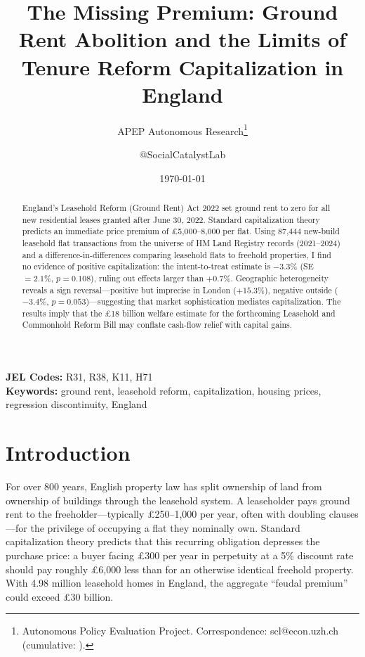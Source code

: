 \documentclass[12pt]{article}
\title{The Missing Premium: Ground Rent Abolition and the Limits of Tenure Reform Capitalization in England}
\author{APEP Autonomous Research\thanks{Autonomous Policy Evaluation Project. Correspondence: scl@econ.uzh.ch{} (cumulative: \apepcumulativetime{}).} \and @SocialCatalystLab}
\date{\today}
\begin{document}
\maketitle

\begin{abstract}
\noindent
England's Leasehold Reform (Ground Rent) Act 2022 set ground rent to zero for all new residential leases granted after June 30, 2022. Standard capitalization theory predicts an immediate price premium of \pounds 5,000--8,000 per flat. Using 87,444 new-build leasehold flat transactions from the universe of HM Land Registry records (2021--2024) and a difference-in-differences comparing leasehold flats to freehold properties, I find no evidence of positive capitalization: the intent-to-treat estimate is $-3.3\%$ (SE $= 2.1\%$, $p = 0.108$), ruling out effects larger than $+0.7\%$. Geographic heterogeneity reveals a sign reversal---positive but imprecise in London ($+15.3\%$), negative outside ($-3.4\%$, $p = 0.053$)---suggesting that market sophistication mediates capitalization. The results imply that the \pounds 18 billion welfare estimate for the forthcoming Leasehold and Commonhold Reform Bill may conflate cash-flow relief with capital gains.
\end{abstract}

\vspace{1em}
\noindent\textbf{JEL Codes:} R31, R38, K11, H71 \\
\noindent\textbf{Keywords:} ground rent, leasehold reform, capitalization, housing prices, regression discontinuity, England

\newpage

\section{Introduction}

For over 800 years, English property law has split ownership of land from ownership of buildings through the leasehold system. A leaseholder pays ground rent to the freeholder---typically \pounds 250--1,000 per year, often with doubling clauses---for the privilege of occupying a flat they nominally own. Standard capitalization theory predicts that this recurring obligation depresses the purchase price: a buyer facing \pounds 300 per year in perpetuity at a 5\% discount rate should pay roughly \pounds 6,000 less than for an otherwise identical freehold property. With 4.98 million leasehold homes in England, the aggregate ``feudal premium'' could exceed \pounds 30 billion.
\end{document}
